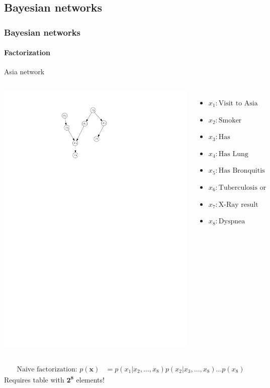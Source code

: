 \documentclass[slidestop,compress,mathserif]{beamer}
\newcommand{\bi}{\begin{itemize}}
\newcommand{\ei}{\end{itemize}}
\begin{document}
\subsection{Bayesian networks}
\begin{frame}
	\frametitle{Bayesian networks}
	\framesubtitle{Factorization}
    \begin{description}
    \item[Asia network]
    \end{description}
    \begin{columns}
    \begin{center}
    \includegraphics[width=.7\textwidth]{asia}%
    \end{center}
    \bi
     \item $x_1: \text{Visit to Asia}$
     \item  $x_2: \text{Smoker}$
     \item  $x_3: \text{Has Tuberculosis}$
     \item  $x_4: \text{Has Lung Cancer}$
     \item  $x_5: \text{Has Bronquitis}$
     \item  $x_6: \text{Tuberculosis or Cancer}$
     \item  $x_7: \text{X-Ray result}$
     \item  $x_8: \text{Dyspnea}$
    \ei
         \end{columns}
         \begin{align*}
         \text{Naive factorization: } p(\mathbf{x}) & = p(x_1|x_2,\hdots,x_8)p(x_2|x_3,\hdots,x_8) \hdots p(x_8)
         \end{align*}
         Requires table with $\mathbf{2^8}$ elements!
\end{frame}
\end{document}
